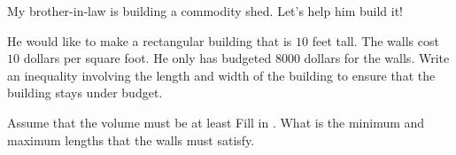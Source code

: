 \documentclass[addpoints,12pt]{exam}
\newcommand{\BM}[1]{{\color{red} #1}}
\begin{document}
\begin{center}
\end{center}
\vspace{0.1in}
\vspace{0.2in}



\begin{questions}
	\question My brother-in-law is building a commodity shed. Let's help him build it! 
	\begin{parts}
		\item He would like to make a rectangular building that is $10$ feet tall. The walls cost $10$ dollars per square foot. He only has budgeted $8000$ dollars for the walls. Write an inequality involving the length and width of the building to ensure that the building stays under budget. 
		\item Assume that the volume must be at least \BM{Fill in }. What is the minimum and maximum lengths that the walls must satisfy. 
	\end{parts}
\end{questions}

    
\end{document}
